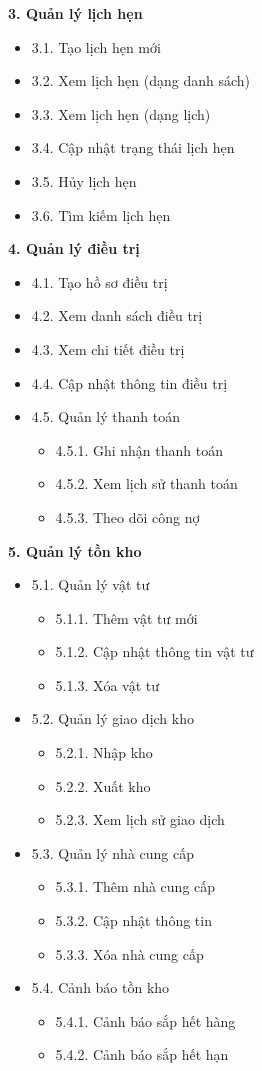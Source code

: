 \textbf{3. Quản lý lịch hẹn}
\begin{itemize}
\item 3.1. Tạo lịch hẹn mới
\item 3.2. Xem lịch hẹn (dạng danh sách)
\item 3.3. Xem lịch hẹn (dạng lịch)
\item 3.4. Cập nhật trạng thái lịch hẹn
\item 3.5. Hủy lịch hẹn
\item 3.6. Tìm kiếm lịch hẹn
\end{itemize}

\textbf{4. Quản lý điều trị}
\begin{itemize}
\item 4.1. Tạo hồ sơ điều trị
\item 4.2. Xem danh sách điều trị
\item 4.3. Xem chi tiết điều trị
\item 4.4. Cập nhật thông tin điều trị
\item 4.5. Quản lý thanh toán
    \begin{itemize}
    \item 4.5.1. Ghi nhận thanh toán
    \item 4.5.2. Xem lịch sử thanh toán
    \item 4.5.3. Theo dõi công nợ
    \end{itemize}
\end{itemize}

\textbf{5. Quản lý tồn kho}
\begin{itemize}
\item 5.1. Quản lý vật tư
    \begin{itemize}
    \item 5.1.1. Thêm vật tư mới
    \item 5.1.2. Cập nhật thông tin vật tư
    \item 5.1.3. Xóa vật tư
    \end{itemize}
\item 5.2. Quản lý giao dịch kho
    \begin{itemize}
    \item 5.2.1. Nhập kho
    \item 5.2.2. Xuất kho
    \item 5.2.3. Xem lịch sử giao dịch
    \end{itemize}
\item 5.3. Quản lý nhà cung cấp
    \begin{itemize}
    \item 5.3.1. Thêm nhà cung cấp
    \item 5.3.2. Cập nhật thông tin
    \item 5.3.3. Xóa nhà cung cấp
    \end{itemize}
\item 5.4. Cảnh báo tồn kho
    \begin{itemize}
    \item 5.4.1. Cảnh báo sắp hết hàng
    \item 5.4.2. Cảnh báo sắp hết hạn
    \end{itemize}
\end{itemize}

